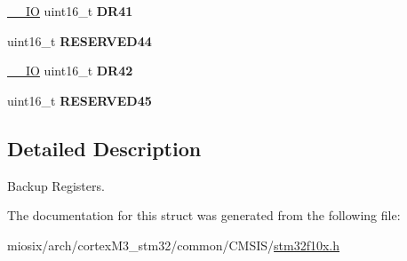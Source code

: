 \begin{DoxyCompactItemize}
\item 
\hypertarget{struct_b_k_p___type_def_a9e9b72b388e2ed718df333cfb9e90226}{\hyperlink{group___c_m_s_i_s__core__definitions_gaec43007d9998a0a0e01faede4133d6be}{\-\_\-\-\_\-\-I\-O} uint16\-\_\-t {\bfseries D\-R41}}\label{struct_b_k_p___type_def_a9e9b72b388e2ed718df333cfb9e90226}

\item 
\hypertarget{struct_b_k_p___type_def_ace6f58bc4fe4083665e1512dfc6018c2}{uint16\-\_\-t {\bfseries R\-E\-S\-E\-R\-V\-E\-D44}}\label{struct_b_k_p___type_def_ace6f58bc4fe4083665e1512dfc6018c2}

\item 
\hypertarget{struct_b_k_p___type_def_af7a01e3a3e1be76ebb8100e7ff6de9c0}{\hyperlink{group___c_m_s_i_s__core__definitions_gaec43007d9998a0a0e01faede4133d6be}{\-\_\-\-\_\-\-I\-O} uint16\-\_\-t {\bfseries D\-R42}}\label{struct_b_k_p___type_def_af7a01e3a3e1be76ebb8100e7ff6de9c0}

\item 
\hypertarget{struct_b_k_p___type_def_affa0a45a3aaa83ef2949761b44ad4283}{uint16\-\_\-t {\bfseries R\-E\-S\-E\-R\-V\-E\-D45}}\label{struct_b_k_p___type_def_affa0a45a3aaa83ef2949761b44ad4283}

\end{DoxyCompactItemize}


\subsection{Detailed Description}
Backup Registers. 

The documentation for this struct was generated from the following file\-:\begin{DoxyCompactItemize}
\item 
miosix/arch/cortex\-M3\-\_\-stm32/common/\-C\-M\-S\-I\-S/\hyperlink{stm32f10x_8h}{stm32f10x.\-h}\end{DoxyCompactItemize}
